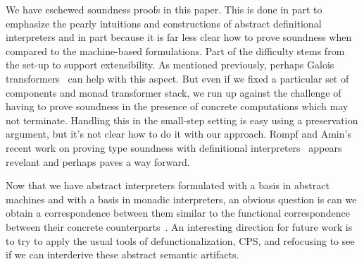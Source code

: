 We have eschewed soundness proofs in this paper.  This is done in part to
emphasize the pearly intuitions and constructions of abstract definitional
interpreters and in part because it is far less clear how to prove soundness
when compared to the machine-based formulations. Part of the difficulty stems
from the set-up to support extensibility. As mentioned previously, perhaps
Galois transformers~\cite{local:darais-oopsla2015} can help with this aspect.
But even if we fixed a particular set of components and monad transformer
stack, we run up against the challenge of having to prove soundness in the
presence of concrete computations which may not terminate. Handling this in the
small-step setting is easy using a preservation argument, but it's not clear
how to do it with our approach.  Rompf and Amin's recent work on proving type
soundness with definitional interpreters~\cite{local:rompf-arxiv2015} appears
revelant and perhaps paves a way forward.

Now that we have abstract interpreters formulated with a basis in abstract
machines and with a basis in monadic interpreters, an obvious question is can
we obtain a correspondence between them similar to the functional
correspondence between their concrete
counterparts~\cite{dvanhorn:Ager2005Functional}.  An interesting direction for
future work is to try to apply the usual tools of defunctionalization, CPS, and
refocusing to see if we can interderive these abstract semantic artifacts.
